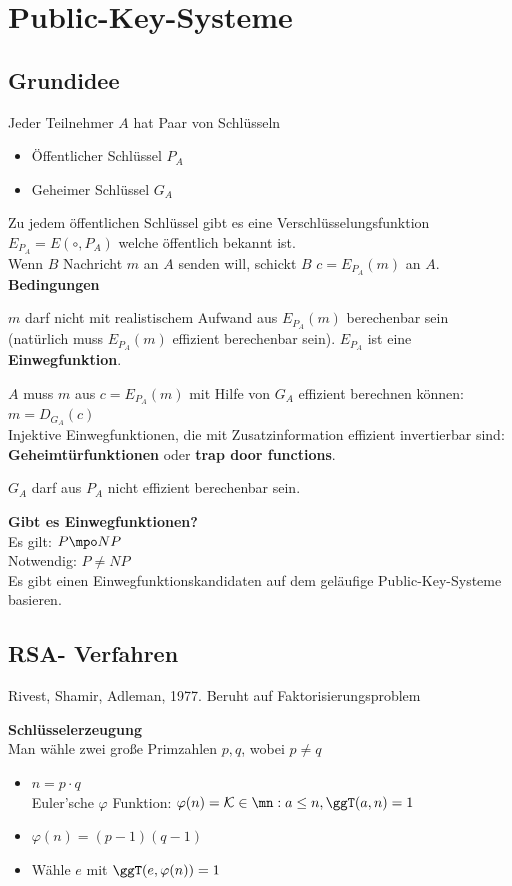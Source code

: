 \section{Public-Key-Systeme}
	\subsection{Grundidee}
		Jeder Teilnehmer $A$ hat Paar von Schlüsseln
		\begin{itemize}
			\item Öffentlicher Schlüssel $P_A$
			\item Geheimer Schlüssel $G_A$
		\end{itemize}
		Zu jedem öffentlichen Schlüssel gibt es eine Verschlüsselungsfunktion	 $E_{P_A}=E(\circ, P_A)$ welche öffentlich bekannt ist.\\
		Wenn $B$ Nachricht $m$ an $A$ senden will, schickt $B$ $c=E_{P_A}(m)$ an $A$.
\newpage
		\textbf{Bedingungen}
			\item $m$ darf nicht mit realistischem Aufwand aus $E_{P_A}(m)$ berechenbar sein (natürlich muss $E_{P_A}(m)$ effizient berechenbar sein). $E_{P_A}$ ist eine \textbf{Einwegfunktion}.
			\item $A$ muss $m$ aus $c=E_{P_A}(m)$ mit Hilfe von $G_A$ effizient berechnen können: $m=D_{G_A}(c)$\\
			Injektive Einwegfunktionen, die mit Zusatzinformation effizient invertierbar sind: \textbf{Geheimtürfunktionen} oder \textbf{trap door functions}.
			\item $G_A$ darf aus $P_A$ nicht effizient berechenbar sein.
		\subExEnd
		
		\textbf{Gibt es Einwegfunktionen?}\\
		Es gilt: $P\mpo NP$\\
		Notwendig: $P\neq NP$\\
		Es gibt einen Einwegfunktionskandidaten auf dem geläufige Public-Key-Systeme basieren.
	
	\subsection{RSA- Verfahren}
		Rivest, Shamir, Adleman, 1977. Beruht auf Faktorisierungsproblem
			\item \textbf{Schlüsselerzeugung}\\
				Man wähle zwei große Primzahlen $p,q$, wobei $p\neq q$
				
				\begin{itemize}
					\item $n=p\cdot q$\\
						Euler'sche $\varphi$ Funktion: $\varphi(n)=\mathcal{K}\in\mn:a\leq n, \ggT(a,n)=1$
					\item $\varphi(n)=(p-1)(q-1)$
					\item Wähle $e$ mit $\ggT(e,\varphi(n))=1$
				\end{itemize}
				

